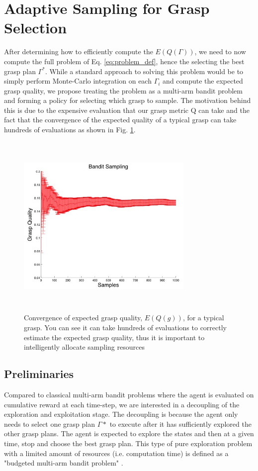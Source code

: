 \documentclass[letterpaper, 10 pt, conference]{ieeeconf}  %
\begin{document}
\section{Adaptive Sampling for Grasp Selection}
After determining how to efficiently compute the $E(Q(\Gamma))$, we need to now compute the full problem of Eq. \ref{eq:problem_def}, hence the selecting the best grasp plan $\Gamma^*$. While a standard approach to solving this problem would be to simply perform Monte-Carlo integration on each $\Gamma_i$ and compute the expected grasp quality, we propose treating the problem as a multi-arm bandit problem and forming a policy for selecting which grasp to sample. The motivation behind this is due to the expensive evaluation that our grasp metric Q can take \cite{ferrari1992} and the fact that the convergence of the expected quality of a typical grasp can take hundreds of evaluations as shown in Fig. \ref{fig:sampling_convergence}.  %

\begin{figure}[ht!]
\centering
\includegraphics[width=8.5cm,height=9cm]{figures/Slide11.jpg}
\caption{Convergence of expected grasp quality, $E(Q(g))$,  for a typical grasp. You can see it can take hundreds of evaluations to correctly estimate the expected grasp quality, thus it is important to  intelligently allocate sampling resources}
\vspace*{-10pt}
\label{fig:sampling_convergence}
\end{figure}


\subsection{Preliminaries}
Compared to classical multi-arm bandit problems where the agent is evaluated on cumulative reward at each time-step, we are interested in a decoupling of the exploration and exploitation stage. The decoupling is because the agent only needs to select one grasp plan $\Gamma*$ to execute after it has sufficiently explored the other grasp plans. The agent is expected to explore the states and then at a given time, stop and choose the best grasp plan. This type of pure exploration problem with a limited amount of resources (i.e. computation time) is defined as a "budgeted multi-arm bandit problem" \cite{madani2004budgeted}. 
\end{document}
